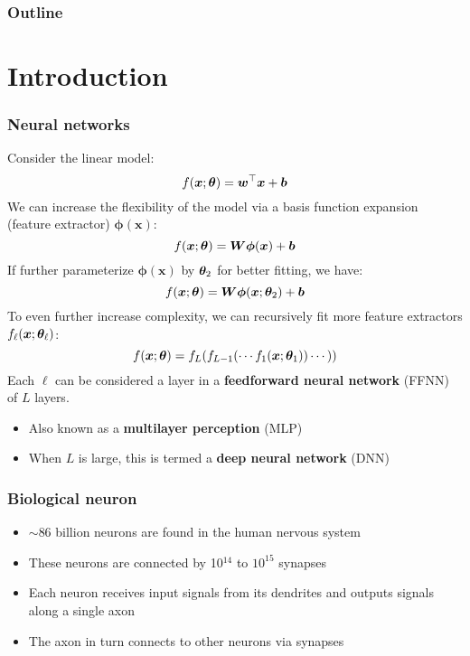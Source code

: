 \documentclass[smaller]{beamer}
\begin{document}
\maketitle
\begin{frame}
  \frametitle{Outline}
  \tableofcontents
\end{frame}

 
 
 
\section{Introduction}
\begin{frame}
  \frametitle{Neural networks}
  \pe
  Consider the linear model:\pe
  \begin{equation}
    f(\bm x;\bm{\theta}) = \bm w^{\top}\bm x + \bm b
  \end{equation}\pe
  We can increase the flexibility of the model via a basis function expansion (feature extractor) $\bm\phi(\bm x)$:\pe
  \begin{equation}
    f(\bm x;\bm{\theta}) = \bm W\bm\phi(\bm x) + \bm b
  \end{equation}
  \pe
  If further parameterize $\bm\phi(\bm x)$ by $\bm{\theta}_{2}$ for better fitting, we have:\pe
  \begin{equation}
    f(\bm x;\bm{\theta}) = \bm W\bm\phi(\bm x;\bm{\theta}_{2}) + \bm b
  \end{equation}
  To even further increase complexity, we can recursively fit more feature extractors $f_{\ell}(\bm x;\bm{\theta}_{\ell})$:
  \pe
  \begin{equation}
    f(\bm x;\bm{\theta}) = f_{L}(f_{L-1}(\cdots f_{1}(\bm x;\bm {\theta}_{1}))\cdots))
  \end{equation}
  Each $\ell$ can be considered a layer in a \textbf{feedforward neural network} (FFNN) of $L$ layers.\pe
  \begin{itemize}
  \item Also known as a \textbf{multilayer perception} (MLP)
  \item When $L$ is large, this is termed a \textbf{deep neural network} (DNN)
  \end{itemize}
\end{frame}
\begin{frame}
  \frametitle{Biological neuron}
  \pause



  \begin{itemize}[<+->]
  \item $\sim$86 billion neurons are found in the human nervous system
  \item These neurons are connected by 10$^{14}$ to $10^{15}$ synapses
  \item Each neuron receives input signals from its dendrites and outputs signals along a single axon
  \item The axon in turn connects to other neurons via synapses
  \end{itemize}
\end{frame}
\end{document}
